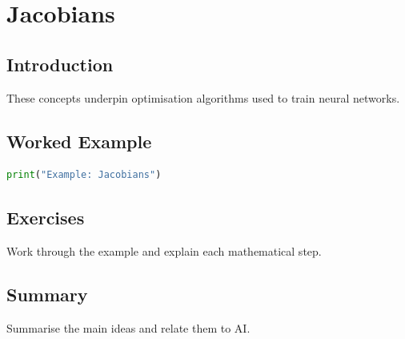 \chapter{Jacobians}
\label{chap:vol4-18}



\section{Introduction}
These concepts underpin optimisation algorithms used to train neural networks.

\section{Worked Example}
\begin{lstlisting}[language=Python]
print("Example: Jacobians")
\end{lstlisting}

\section{Exercises}
\begin{exercise}
Work through the example and explain each mathematical step.
\end{exercise}

\section{Summary}
Summarise the main ideas and relate them to AI.
